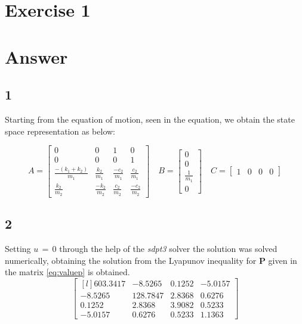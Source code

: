 \section{Exercise 1}

\section{Answer}
\subsection{1}
Starting from the equation of motion, seen in the equation, we obtain the
state space representation as below:

\[
	A =
	\begin{bmatrix}
		0  	& 		0 		&      1	 	&     0\\
		0 	&     0 		&      0 		&     1\\
		\frac{-(k_1 + k_2)}{m_1} & \frac{k_2}{m_1} & \frac{-c_2}{m_1} & \frac{c_2}{m_1}\\
		\frac{k_2}{m_2} & \frac{-k_2}{m_2} & \frac{c_2}{m_2} & \frac{-c_2}{m_2}
	\end{bmatrix}\quad
	B =
	\begin{bmatrix}
		0\\
		0\\
		\frac{1}{m_1}\\
		0
	\end{bmatrix}\quad
	C =
	\begin{bmatrix}
		1   &  0   &  0  &   0
	\end{bmatrix}
\]

\subsection{2}
Setting \(u\,=\,0\) through the help of the \emph{sdpt3} solver the solution
was solved numerically, obtaining the solution from the Lyapunov inequality for
 \(\mathbf{P}\) given in the matrix \eqref{eq:valuep} is obtained.
 \begin{equation}
 	\label{eq:valuep}
 	\begin{bmatrix*}[l]
 		603.3417	&   -8.5265	&    0.1252	&   -5.0157\\[5pt]
		-8.5265	&  128.7847	&    2.8368	&    0.6276\\[5pt]
		0.1252	&    2.8368	&    3.9082	&    0.5233\\[5pt]
		-5.0157	&    0.6276	&    0.5233	&    1.1363
	\end{bmatrix*}
\end{equation}

